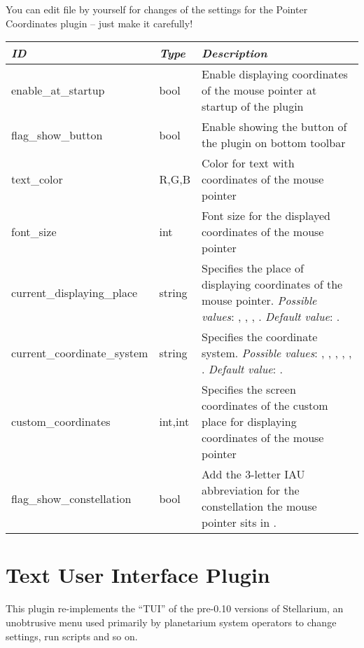 You can edit  file by yourself for changes of the
settings for the Pointer Coordinates plugin -- just make it carefully!

\begin{longtabu} to \textwidth {l|l|X}\toprule
\emph{ID}            & \emph{Type} & \emph{Description}\\\midrule
enable\_at\_startup  & bool & Enable displaying coordinates of the mouse pointer at startup of the plugin\\\midrule
flag\_show\_button   & bool & Enable showing the button of the plugin on bottom toolbar\\\midrule
text\_color          & R,G,B & Color for text with coordinates of the mouse pointer \\\midrule
font\_size           & int & Font size for the displayed coordinates of the mouse pointer \\\midrule
current\_displaying\_place  & string & Specifies the place of displaying coordinates of the mouse pointer. \textit{Possible values}: , , , . \textit{Default value}: . \\\midrule
current\_coordinate\_system & string & Specifies the coordinate system. \textit{Possible values}: , , , , , . \textit{Default value}: . \\\midrule
custom\_coordinates  & int,int & Specifies the screen coordinates of the custom place for displaying coordinates of the mouse pointer \\\midrule
flag\_show\_constellation &bool& Add the 3-letter IAU abbreviation for the constellation the mouse pointer sits in \cite{1987PASP...99..695R}.\\\bottomrule
\end{longtabu}




\newpage

\section{Text User Interface Plugin}
\label{sec:plugins:TextUserInterface}


This plugin re-implements the ``TUI'' of the pre-0.10 versions of
Stellarium, an unobtrusive menu used primarily by planetarium system
operators to change settings, run scripts and so on.

